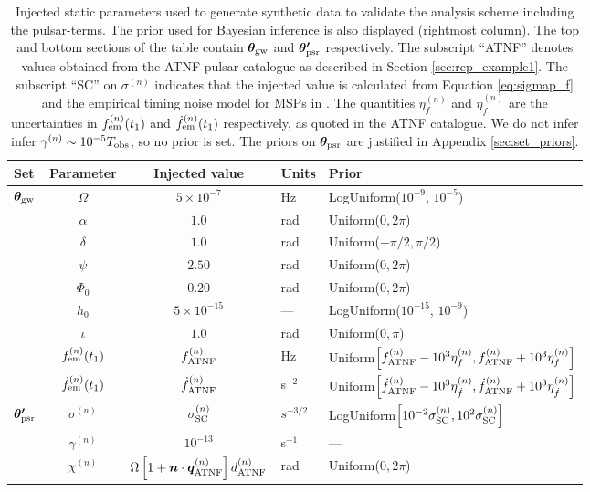 \documentclass[fleqn,usenatbib,useAMS]{mnras}
\begin{document}
\begin{table}
	\centering
		\begin{tabular}{lccll}
			\toprule
			Set&Parameter & Injected value & Units & Prior  \\
			\hline
			\multirow{7}{2mm}{$\boldsymbol{\theta}_{\rm gw}$} & $\Omega$       & $5 \times 10^{-7}$ & Hz & LogUniform($10^{-9}$, $10^{-5}$) \\
			& $\alpha$          & $1.0$  & rad & Uniform($0, 2 \pi $)\\
			& $\delta$              & $1.0$  & rad & Uniform($-\pi/2, \pi/2$) \\
			& $\psi$              & $2.50$ & rad & Uniform($0, 2 \pi $) \\
			& $\Phi_0$          & $0.20$ & rad & Uniform($0, 2 \pi $) \\
			& $h_0$            & $5 \times 10^{-15}$ & --- & LogUniform($10^{-15}$, $10^{-9}$) \\
			& $\iota$             & $1.0$ & rad & Uniform($0, \pi$) \\ 
			\hline
			& $f_{\rm em}^{(n)} (t_1)$       & $f_{\rm ATNF}^{(n)}$ & Hz & Uniform$\left[f_{\rm ATNF}^{(n)} - 10^3 \eta^{(n)}_{f}, f_{\rm ATNF}^{(n)} + 10^3 \eta^{(n)}_{f} \right]$ \\
       & $\dot{f}_{\rm em}^{(n)} (t_1)$       & $\dot{f}_{\rm ATNF}^{(n)}$ & s$^{-2}$ & Uniform$\left[ \dot{f}_{\rm ATNF}^{(n)} - 10^3 \eta^{(n)}_{\dot{f}}, \dot{f}_{\rm ATNF}^{(n)} + 10^3 \eta^{(n)}_{\dot{f}} \right]$ \\
		     $\boldsymbol{\theta'}_{\rm psr}$ & $\sigma^{(n)}$              & $\sigma_{\rm SC}^{(n)}$ & $s^{-3/2}$ & LogUniform$ \left [10^{-2} \sigma_{\rm SC}^{(n)}, 10^2 \sigma_{\rm SC}^{(n)} \right ]$ \\
			& $\gamma^{(n)}$              & $10^{-13}$ & s$^{-1}$ & --- \\
			\vspace{1mm} &  $\chi^{(n)}$       &$\Omega \left[ 1 + \boldsymbol{n}\cdot \boldsymbol{q}^{(n)}_{\rm ATNF} \right]  d_{\rm ATNF}^{(n)} $  & rad & Uniform($0, 2 \pi $) \\
			\bottomrule
		\end{tabular}
		\caption{Injected static parameters used to generate synthetic data to validate the analysis scheme including the pulsar-terms. The prior used for Bayesian inference is also displayed (rightmost column).  The top and bottom sections of the table contain $\boldsymbol{\theta}_{\rm gw}$ and $\boldsymbol{\theta'}_{\rm psr}$ respectively. The subscript ``ATNF'' denotes values obtained from the ATNF pulsar catalogue as described in Section \ref{sec:rep_example1}. The subscript ``SC'' on $\sigma^{(n)}$ indicates that the injected value is calculated from Equation \eqref{eq:sigmap_f} and the empirical timing noise model for MSPs in \protect \cite{Shannon2010}. The quantities $\eta^{(n)}_{f}$ and $\eta^{(n)}_{\dot{f}}$ are the uncertainties in $f^{(n)}_{\rm em} (t_1)$ and $\dot{f}^{(n)}_{\rm em} (t_1)$ respectively, as quoted in the ATNF catalogue. We do not infer infer $\gamma^{(n)} \sim 10^{-5} T_{\rm obs}$, so no prior is set. The priors on $\boldsymbol{\theta}_{\rm psr}$ are justified in Appendix \ref{sec:set_priors}.
}
\end{table}
\end{document}
